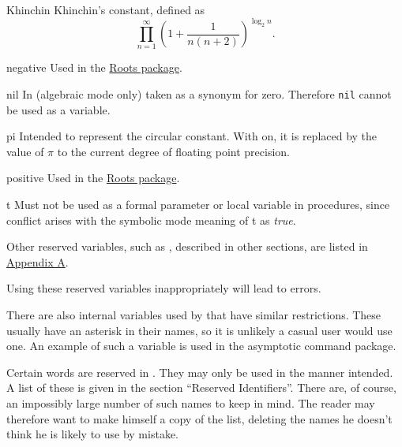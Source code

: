 \begin{list}{}
\item[Khinchin] Khinchin's constant, defined as
  \[
    \prod_{n=1}^{\infty}\left(1+\frac{1}{n(n+2)}\right)^{\log_{2} n} .
  \]

\item[negative] Used in the \hyperlink{package:ROOTS}{Roots package}.

\item[nil] In {\REDUCE} (algebraic mode only)
taken as a synonym for zero.  Therefore \texttt{nil} cannot be used as a
variable.

\item[pi] Intended to represent the circular
constant.  With  on, it is replaced by the value of $\pi$ to
the current degree of floating point precision.

\item[positive] Used in the \hyperlink{package:ROOTS}{Roots package}.

\item[t] Must not be used as a formal
parameter or local variable in procedures, since conflict arises with the
symbolic mode meaning of t as \emph{true}.
\end{list}

Other reserved variables, such as \hyperlink{reserved:LOW_POW}{},
described in other sections,
are listed in \hyperlink{sec:appendixa}{Appendix A}.

Using these reserved variables inappropriately
will lead to errors.

There are also internal variables used by {\REDUCE} that have similar
restrictions. These usually have an asterisk in their names, so it is
unlikely a casual user would use one. An example of such a variable is
 used in the asymptotic command package.

Certain words are reserved in {\REDUCE}. They may only be used in the manner
intended. A list of these is given in the section ``Reserved Identifiers''.
There are, of course, an impossibly large number of such names to keep in
mind. The reader may therefore want to make himself a copy of the list,
deleting the names he doesn't think he is likely to use by mistake.

